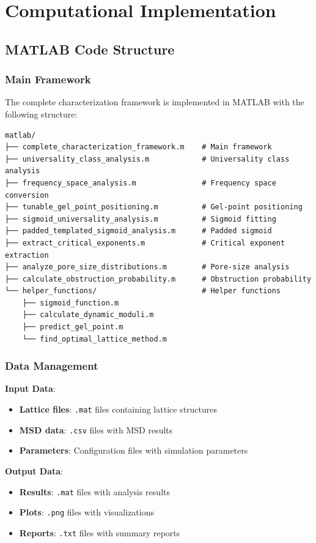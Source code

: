 \section{Computational Implementation}
\label{app:computational}

\subsection{MATLAB Code Structure}

\subsubsection{Main Framework}
The complete characterization framework is implemented in MATLAB with the following structure:

\begin{verbatim}
matlab/
├── complete_characterization_framework.m    # Main framework
├── universality_class_analysis.m            # Universality class analysis
├── frequency_space_analysis.m               # Frequency space conversion
├── tunable_gel_point_positioning.m          # Gel-point positioning
├── sigmoid_universality_analysis.m          # Sigmoid fitting
├── padded_templated_sigmoid_analysis.m      # Padded sigmoid
├── extract_critical_exponents.m             # Critical exponent extraction
├── analyze_pore_size_distributions.m        # Pore-size analysis
├── calculate_obstruction_probability.m      # Obstruction probability
└── helper_functions/                        # Helper functions
    ├── sigmoid_function.m
    ├── calculate_dynamic_moduli.m
    ├── predict_gel_point.m
    └── find_optimal_lattice_method.m
\end{verbatim}

\subsubsection{Data Management}
\textbf{Input Data}:
\begin{itemize}
    \item \textbf{Lattice files}: \texttt{.mat} files containing lattice structures
    \item \textbf{MSD data}: \texttt{.csv} files with MSD results
    \item \textbf{Parameters}: Configuration files with simulation parameters
\end{itemize}

\textbf{Output Data}:
\begin{itemize}
    \item \textbf{Results}: \texttt{.mat} files with analysis results
    \item \textbf{Plots}: \texttt{.png} files with visualizations
    \item \textbf{Reports}: \texttt{.txt} files with summary reports
\end{itemize}

